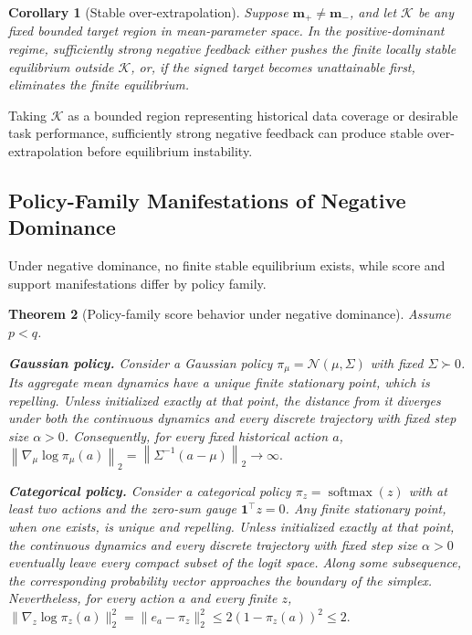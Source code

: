 \documentclass{article}
\theoremstyle{plain}
\newtheorem{theorem}{Theorem}[section]
\newtheorem{corollary}[theorem]{Corollary}
\theoremstyle{definition}
\theoremstyle{remark}
\begin{document}
\begin{corollary}[Stable over-extrapolation]
\label{cor:stable_over_extrapolation}
Suppose \(\mathbf m_+\neq\mathbf m_-\), and let \(\mathcal K\) be any
fixed bounded target region in mean-parameter space. In the
positive-dominant regime, sufficiently strong negative feedback either
pushes the finite locally stable equilibrium outside \(\mathcal K\), or,
if the signed target becomes unattainable first, eliminates the finite
equilibrium.
\end{corollary}

Taking \(\mathcal K\) as a bounded region representing historical data
coverage or desirable task performance, sufficiently strong negative feedback
can produce stable over-extrapolation before equilibrium instability.

\subsection{Policy-Family Manifestations of Negative Dominance}
\label{sec:policy_family_manifestations}

Under negative dominance, no finite stable equilibrium exists, while score
and support manifestations differ by policy family.

\begin{theorem}[Policy-family score behavior under negative dominance]
\label{thm:policy_family_manifestations}
Assume \(p<q\).

\textbf{Gaussian policy.}
Consider a Gaussian policy
\(\pi_\mu=\mathcal N(\mu,\Sigma)\) with fixed
\(\Sigma\succ0\). Its aggregate mean dynamics have a unique finite
stationary point, which is repelling. Unless initialized exactly at that
point, the distance from it diverges under both the continuous dynamics
and every discrete trajectory with fixed step size \(\alpha>0\).
Consequently, for every fixed historical action \(a\),
\(
    \left\|
        \nabla_\mu\log\pi_\mu(a)
    \right\|_2
    =
    \left\|
        \Sigma^{-1}(a-\mu)
    \right\|_2
    \longrightarrow
    \infty.
\)

\textbf{Categorical policy.}
Consider a categorical policy
\(\pi_z=\operatorname{softmax}(z)\) with at least two actions and the
zero-sum gauge \(\mathbf 1^\top z=0\). Any finite stationary point, when
one exists, is unique and repelling. Unless initialized exactly at that
point, the continuous dynamics and every discrete trajectory with fixed
step size \(\alpha>0\) eventually leave every compact subset of the
logit space. Along some subsequence, the corresponding probability
vector approaches the boundary of the simplex. Nevertheless, for every
action \(a\) and every finite \(z\),
\(
\|\nabla_z\log\pi_z(a)\|_2^2
=
\|e_a-\pi_z\|_2^2
\le 2(1-\pi_z(a))^2
\le 2.
\)
\end{theorem}
\end{document}
